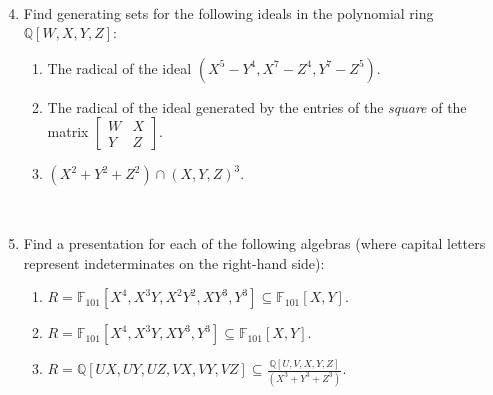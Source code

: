 \documentclass[12pt]{amsart}
\newcommand{\Q}{\mathbb{Q}}
\newcommand{\F}{\mathbb{F}}
\begin{document}
\

\begin{enumerate}\setcounter{enumi}{3}


\item Find generating sets for the following ideals in the polynomial ring $\Q[W,X,Y,Z]$:
\begin{enumerate}
\item The radical of the ideal $(X^5-Y^4,X^7-Z^4,Y^7-Z^5)$.
\item The radical of the ideal generated by the entries of the \emph{square} of the matrix $\begin{bmatrix} W & X \\ Y& Z\end{bmatrix}$.
\item $(X^2+Y^2+Z^2) \cap (X,Y,Z)^3$.
\end{enumerate}

\

\item Find a presentation for each of the following algebras (where capital letters represent indeterminates on the right-hand side):
\begin{enumerate}
\item $R=\F_{101}[X^4,X^3Y,X^2Y^2,XY^3,Y^3]\subseteq \F_{101}[X,Y]$.
\item  $R=\F_{101}[X^4,X^3Y,XY^3,Y^3]\subseteq \F_{101}[X,Y]$.
\item  $\displaystyle R=\Q[UX,UY,UZ,VX,VY,VZ]\subseteq \frac{\Q[U,V,X,Y,Z]}{(X^3+Y^3+Z^3)}$.
\end{enumerate}

\



\end{enumerate}
\end{document}
